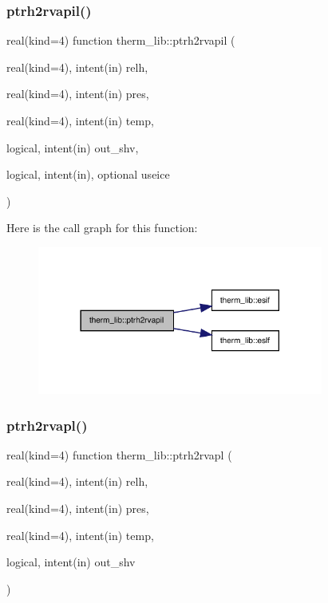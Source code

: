\subsubsection{\texorpdfstring{ptrh2rvapil()}{ptrh2rvapil()}}
{\footnotesize\ttfamily real(kind=4) function therm\+\_\+lib\+::ptrh2rvapil (\begin{DoxyParamCaption}\item[{real(kind=4), intent(in)}]{relh,  }\item[{real(kind=4), intent(in)}]{pres,  }\item[{real(kind=4), intent(in)}]{temp,  }\item[{logical, intent(in)}]{out\+\_\+shv,  }\item[{logical, intent(in), optional}]{useice }\end{DoxyParamCaption})}

Here is the call graph for this function\+:
\nopagebreak
\begin{figure}[H]
\begin{center}
\leavevmode
\includegraphics[width=266pt]{namespacetherm__lib_a0b228d623c4a7506f51e5ffb0af0652f_cgraph}
\end{center}
\end{figure}
\mbox{\label{namespacetherm__lib_a31b5123d35b5fab2d91701e148b5ac1d}} 
\subsubsection{\texorpdfstring{ptrh2rvapl()}{ptrh2rvapl()}}
{\footnotesize\ttfamily real(kind=4) function therm\+\_\+lib\+::ptrh2rvapl (\begin{DoxyParamCaption}\item[{real(kind=4), intent(in)}]{relh,  }\item[{real(kind=4), intent(in)}]{pres,  }\item[{real(kind=4), intent(in)}]{temp,  }\item[{logical, intent(in)}]{out\+\_\+shv }\end{DoxyParamCaption})}

